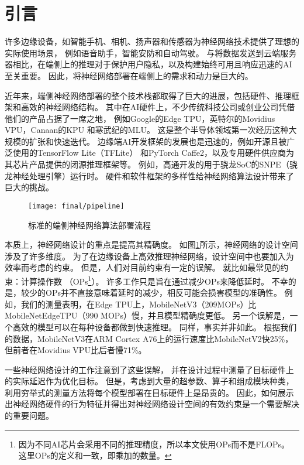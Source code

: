 \cleardoublepage

\section{引言}
许多边缘设备，如智能手机、相机、扬声器和传感器为神经网络技术提供了理想的实际使用场景，
例如语音助手，智能安防和自动驾驶。
与将数据发送到云端服务器相比，在端侧上的推理对于保护用户隐私，以及构建始终可用且响应迅速的AI至关重要。
因此，将神经网络部署在端侧上的需求和动力是巨大的。

近年来，端侧神经网络部署的整个技术栈都取得了巨大的进展，包括硬件、推理框架和高效的神经网络结构。
其中在AI硬件上，不少传统科技公司或创业公司凭借他们的产品占据了一席之地，
例如Google的Edge TPU\cite{edgetpu}，英特尔的Movidius VPU\cite{myriad}，Canaan的KPU\cite{k210}
和寒武纪的MLU\cite{cambricon}。
这是整个半导体领域第一次经历这种大规模的扩张和快速迭代。
边缘端AI开发框架的发展也是迅速的，例如开源且被广泛使用的TensorFlow Lite（TFLite）\cite{tflite}
和PyTorch Caffe2\cite{caffe2}，以及专用硬件供应商为其芯片产品提供的闭源推理框架等。
例如，高通开发的用于骁龙SoC的SNPE（骁龙神经处理引擎）运行时\cite{snpe}。
硬件和软件框架的多样性给神经网络算法设计带来了巨大的挑战。

\begin{figure}[htbp]
    \centering
    \texttt{[image: final/pipeline]}
    \caption{\label{fig:pipeline}标准的端侧神经网络算法部署流程}
\end{figure}

本质上，神经网络设计的重点是提高其精确度。
如图\ref{fig:pipeline}所示，神经网络的设计空间涉及了许多维度。
为了在边缘设备上高效推理神经网络，设计空间中也要加入为效率而考虑的约束。
但是，人们对目前约束有一定的误解。
就比如最常见的约束：计算操作数
（OPs\footnote{因为不同AI芯片会采用不同的推理精度，所以本文使用OPs而不是FLOPs。
这里OPs的定义和\cite{zhang2018shufflenet}一致，即乘加的数量。}）。
许多工作只是旨在通过减少OPs来降低延时。
不幸的是，较少的OPs并不直接意味着延时的减少，相反可能会损害模型的准确性。
例如，我们的测量表明，在Edge TPU上，MobileNetV3（209MOPs）比MobileNetEdgeTPU（990 MOPs）慢，并且模型精确度更低。
另一个误解是，一个高效的模型可以在每种设备都做到快速推理。
同样，事实并非如此。
根据我们的数据，MobileNetV3在ARM Cortex A76上的运行速度比MobileNetV2快25\%，
但前者在Movidius VPU比后者慢71\%。

一些神经网络设计的工作\cite{dai2019chamnet, tan2019mnasnet, yang2018netadapt}注意到了这些误解，
并在设计过程中测量了目标硬件上的实际延迟作为优化目标。
但是，考虑到大量的超参数、算子和组成模块种类，利用穷举式的测量方法将每个模型部署在目标硬件上是昂贵的。
因此，如何展示出神经网络硬件的行为特征并得出对神经网络设计空间的有效约束是一个需要解决的重要问题。

